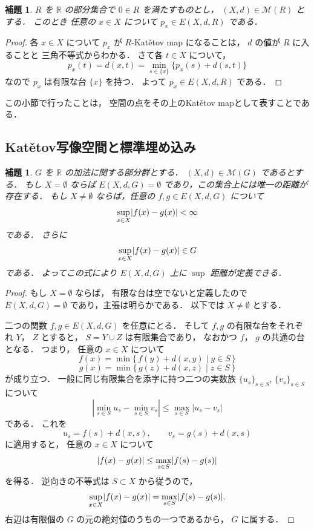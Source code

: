 \documentclass[leqno, 12pt]{jsarticle}
\newtheorem{lem}[thm]{補題}
\newcommand{\rr}{\mathbb{R}}
\DeclarePairedDelimiter{\abs}{\lvert}{\rvert}
\newcommand{\Met}[1]{\mathscr{M}(#1)}
\newcommand{\Espace}[3]{E(#1,#2,#3)}
\newcommand{\kura}[1]{p_{#1}}
\begin{document}
\begin{lem}\label{lem:katetov:embed}
$R$
を
$\rr$
の部分集合で
$0\in R$
を満たすものとし，
$(X, d)\in \Met{R}$
とする．
このとき
任意の
$x\in X$
について
$\kura{x}\in \Espace{X}{d}{R}$
である．
\end{lem}
\begin{proof}
各
$x\in X$
について
$\kura{x}$
が
$R$-Kat\v{e}tov map
になることは，
$d$
の値が
$R$
に入ることと
三角不等式からわかる．
さて各
$t\in X$
について，
\[
\kura{x}(t)
=d(x,t)
=\min_{s\in\{x\}}\{\kura{x}(s)+d(s,t)\}
\]
なので
$\kura{x}$
は有限な台
$\{x\}$
を持つ．
よって
$\kura{x}\in \Espace{X}{d}{R}$
である．
\end{proof}
この小節で行ったことは，%
空間の点をその上のKat\v{e}tov
mapとして表すことである．

\subsection{\texorpdfstring{Kat\v{e}tov}{Katetov}写像空間と標準埋め込み}\label{subsec:katetov:function-space}

\begin{lem}\label{lem:katetov:bounded}
$G$
を
$\rr$
の加法に関する部分群とする．
$(X, d)\in \Met{G}$
であるとする．
もし
$X=\emptyset$
ならば
$\Espace{X}{d}{G}=\emptyset$
であり，この集合上には唯一の距離が存在する．
もし
$X\neq\emptyset$
ならば，任意の
$f, g\in \Espace{X}{d}{G}$
について
\[
\sup_{x\in X}\abs{f(x)-g(x)}<\infty
\]
である．
さらに
\[
\sup_{x\in X}\abs{f(x)-g(x)}\in G
\]
である．
よってこの式により
$\Espace{X}{d}{G}$
上に
$\sup$%
距離が定義できる．
\end{lem}
\begin{proof}
もし
$X=\emptyset$
ならば，
有限な台は空でないと定義したので
$\Espace{X}{d}{G}=\emptyset$
であり，主張は明らかである．
以下では
$X\neq\emptyset$
とする．

二つの関数
$f, g\in \Espace{X}{d}{G}$
を任意にとる．
そして
$f, g$
の有限な台をそれぞれ
$Y$，
$Z$%
とすると，
$S=Y\cup Z$
は有限集合であり，%
なおかつ
$f$，
$g$
の共通の台となる．
つまり，
任意の
$x\in X$
について
\[
f(x)=\min\{\, f(y)+d(x, y)\mid y\in S\, \}
\]
\[
g(x)=\min\{\, g(z)+d(x, z)\mid z\in S\, \}
\]
が成り立つ．
一般に同じ有限集合を添字に持つ二つの実数族
$\{u_s\}_{s\in S}$,
$\{v_s\}_{s\in S}$
について
\[
\left|
\min_{s\in S}u_s-\min_{s\in S}v_s
\right|
\le
\max_{s\in S}|u_s-v_s|
\]
である．
これを
\[
u_s=f(s)+d(x,s),
\qquad
v_s=g(s)+d(x,s)
\]
に適用すると，
任意の
$x\in X$
について
\[
\abs{f(x)-g(x)}
\le
\max_{s\in S}\abs{f(s)-g(s)}
\]
を得る．
逆向きの不等式は
$S\subset X$
から従うので，
\[
\sup_{x\in X}\abs{f(x)-g(x)}
=
\max_{s\in S}\abs{f(s)-g(s)}.
\]
右辺は有限個の
$G$
の元の絶対値のうちの一つであるから，
$G$
に属する．
\end{proof}
\end{document}
